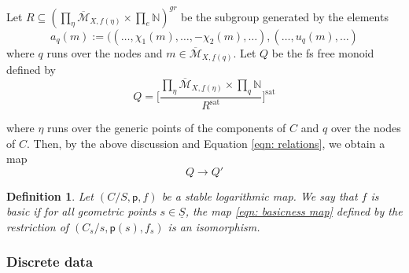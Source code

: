 \documentclass{article}
\def\N{{\mathbb{N}}}
\def\oM{\overline{\mathcal{M}}}
\newtheorem{definition}{Definition}[section]
\newcommand{\sat}{\mathrm{sat}}
\begin{document}
 Let $R \subseteq (\prod_{\eta} \oM_{X,f(\eta)} \times \prod_e \N)^{gr}$ be the subgroup generated by the elements
$$
a_q(m):=( (\ldots, \chi_1(m),\ldots,-\chi_2(m),\ldots),(\ldots,u_q(m),\ldots) 
$$
where $q$ runs over the nodes and $m \in \oM_{X,\underline{f}(q)}$. Let $Q$ be the fs free monoid defined by
\begin{equation}\label{eqn: basic monoids}
   Q=\Bigg[ \frac{\prod_{\eta} \oM_{X,\underline{f}(\eta)} \times \prod_q \N}{R^{\sat}} \Bigg]^{\sat} 
\end{equation}

where $\eta$ runs over  the generic points of the components of $C$ and $q$ over the nodes of $C$. Then, by the above discussion and Equation \eqref{eqn: relations}, we obtain a map 
\begin{equation}\label{eqn: basicness map}
    Q \to Q'
\end{equation}

\begin{definition}
    Let $(C/S,\mathsf{p},f)$ be a stable logarithmic map. We say that $f$ is basic if for all geometric points $s\in \underline{S}$, the map \eqref{eqn: basicness map} defined by the restriction of $(C_s/s,\mathsf{p}(s),f_s)$  is an isomorphism.
\end{definition}

\subsubsection{Discrete data}
\end{document}
